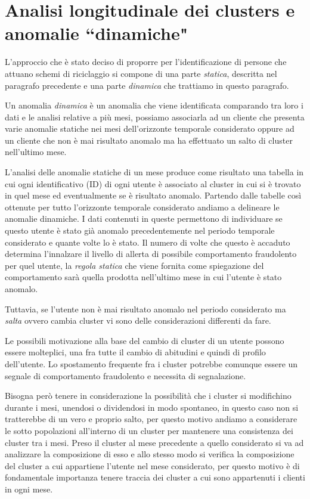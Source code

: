 \section{Analisi longitudinale dei clusters e anomalie ``dinamiche"}

L’approccio che è stato deciso di proporre per l’identificazione di persone che attuano schemi di riciclaggio si compone di una parte \textit{statica}, descritta nel paragrafo precedente e una parte \textit{dinamica} che trattiamo in questo paragrafo.

Un anomalia \textit{dinamica} è un anomalia che viene identificata comparando tra loro i dati e le analisi relative a più mesi, possiamo associarla ad un cliente che presenta varie anomalie statiche nei mesi dell'orizzonte temporale considerato oppure ad un cliente che non è mai risultato anomalo ma ha effettuato un salto di cluster nell'ultimo mese.

L’analisi delle anomalie statiche di un mese produce come risultato una tabella in cui ogni identificativo (ID) di ogni utente è associato al cluster in cui si è trovato in quel mese ed eventualmente se è risultato anomalo. Partendo dalle tabelle così ottenute per tutto l’orizzonte temporale considerato andiamo a delineare le anomalie dinamiche. I dati contenuti in queste permettono di individuare se questo utente è stato già anomalo precedentemente nel periodo temporale considerato e quante volte lo è stato. Il numero di volte che questo è accaduto determina l’innalzare il livello di allerta di possibile comportamento fraudolento per quel utente, la \textit{regola statica} che viene fornita come spiegazione del comportamento sarà quella prodotta nell'ultimo mese in cui l'utente è stato anomalo.

Tuttavia, se l’utente non è mai risultato anomalo nel periodo considerato ma \textit{salta} ovvero cambia cluster vi sono delle considerazioni differenti da fare.

Le possibili motivazione alla base del cambio di cluster di un utente possono essere molteplici, una fra tutte il cambio di abitudini e quindi di profilo dell'utente. Lo spostamento frequente fra i cluster potrebbe comunque essere un segnale di comportamento fraudolento e necessita di segnalazione. 

Bisogna però tenere in considerazione la possibilità che i cluster si modifichino durante i mesi, unendosi o dividendosi in modo spontaneo, in questo caso non si tratterebbe di un vero e proprio salto, per questo motivo andiamo a considerare le sotto popolazioni all'interno di un cluster per mantenere una consistenza dei cluster tra i mesi.
Preso il cluster al mese precedente a quello considerato si va ad analizzare la composizione di esso e allo stesso modo si verifica la composizione del cluster a cui appartiene l’utente nel mese considerato, per questo motivo è di fondamentale importanza tenere traccia dei cluster a cui sono appartenuti i clienti in ogni mese.

